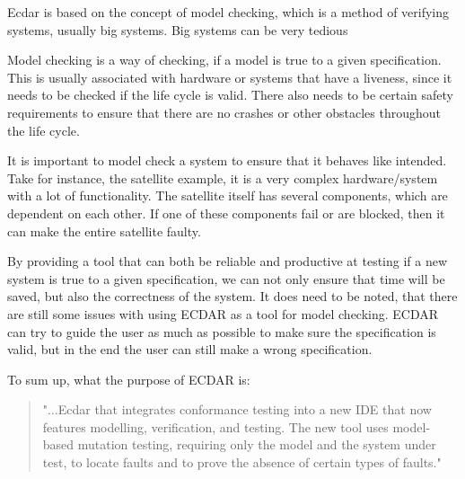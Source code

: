 Ecdar is based on the concept of model checking, which is a method of verifying systems, usually big systems. Big systems can be very tedious 

Model checking is a way of checking, if a model is true to a given specification.
This is usually associated with hardware or systems that have a liveness, since it needs to be checked if the life cycle is valid.
There also needs to be certain safety requirements to ensure that there are no crashes or other obstacles throughout the life cycle.

It is important to model check a system to ensure that it behaves like intended.
Take for instance, the satellite example, it is a very complex hardware/system with a lot of functionality.
The satellite itself has several components, which are dependent on each other.
If one of these components fail or are blocked, then it can make the entire satellite faulty.

By providing a tool that can both be reliable and productive at testing if a new system is true to a given specification, we can not only ensure that time will be saved, but also the correctness of the system.
It does need to be noted, that there are still some issues with using ECDAR as a tool for model checking.
ECDAR can try to guide the user as much as possible to make sure the specification is valid, but in the end the user can still make a wrong specification.


To sum up, what the purpose of ECDAR is:
\begin{quote}
"...Ecdar that integrates conformance testing into a new IDE that now features
modelling, verification, and testing. The new tool uses model-based mutation testing, requiring only
the model and the system under test, to locate faults and to prove the absence of certain types of faults." \cite{Gundersen_2018}
\end{quote}



